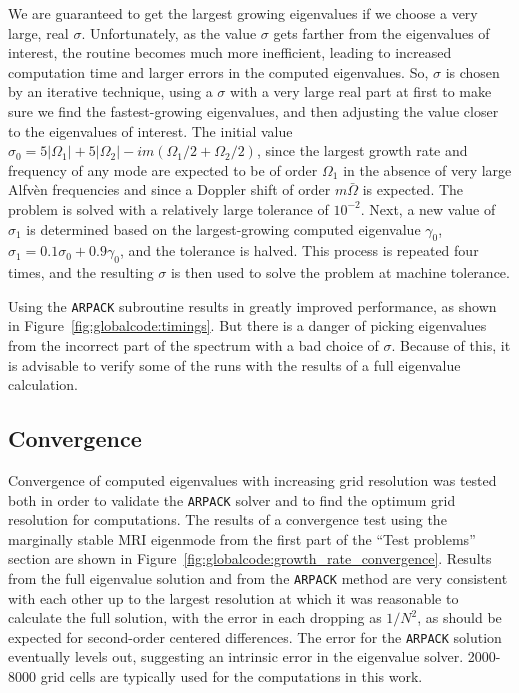 \documentclass[letterpaper]{article}
\begin{document}
We are guaranteed to get the largest growing eigenvalues if we choose
a very large, real $\sigma$. Unfortunately, as the value $\sigma$ gets
farther from the eigenvalues of interest, the routine becomes much
more inefficient, leading to increased computation time and larger
errors in the computed eigenvalues. So, $\sigma$ is chosen by an
iterative technique, using a $\sigma$ with a very large real part at
first to make sure we find the fastest-growing eigenvalues, and then
adjusting the value closer to the eigenvalues of interest. The initial
value $\sigma_0 = 5|\Omega_1| + 5|\Omega_2| - im(\Omega_1/2 +
\Omega_2/2)$, since the largest growth rate and frequency of any mode
are expected to be of order $\Omega_1$ in the absence of very large
Alfv\`{e}n frequencies and since a Doppler shift of order
$m\bar{\Omega}$ is expected. The problem is solved with a relatively
large tolerance of $10^{-2}$. Next, a new value of $\sigma_1$ is
determined based on the largest-growing computed eigenvalue
$\gamma_0$, $\sigma_1 = 0.1\sigma_0 + 0.9\gamma_0$, and the tolerance
is halved. This process is repeated four times, and the resulting
$\sigma$ is then used to solve the problem at machine tolerance.

Using the \texttt{ARPACK} subroutine results in greatly improved
performance, as shown in Figure~\ref{fig:globalcode:timings}. But
there is a danger of picking eigenvalues from the incorrect part of
the spectrum with a bad choice of $\sigma$. Because of this, it is
advisable to verify some of the runs with the results of a full
eigenvalue calculation.

\subsection{Convergence}

Convergence of computed eigenvalues with increasing grid resolution
was tested both in order to validate the \texttt{ARPACK} solver and to
find the optimum grid resolution for computations. The results of a
convergence test using the marginally stable MRI eigenmode from the
first part of the ``Test problems'' section are shown in
Figure~\ref{fig:globalcode:growth_rate_convergence}. Results from the
full eigenvalue solution and from the \texttt{ARPACK} method are very
consistent with each other up to the largest resolution at which it
was reasonable to calculate the full solution, with the error in each
dropping as $1/N^2$, as should be expected for second-order centered
differences. The error for the \texttt{ARPACK} solution eventually
levels out, suggesting an intrinsic error in the eigenvalue
solver. 2000-8000 grid cells are typically used for the computations
in this work.
\end{document}
